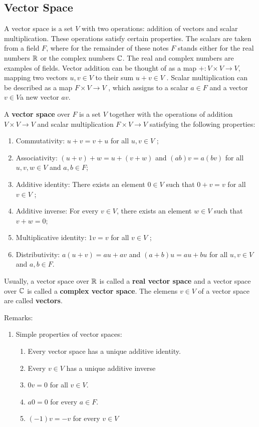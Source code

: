 \documentclass[12pt]{book}
\begin{document}
\subsection{Vector Space}
\label{sec:Vector Space}

A vector space is a set $V$ with two operations: addition of vectors and scalar multiplication. These operations satisfy certain properties. 
The scalars are taken from a field $F$, where for the remainder of these notes $F$ stands either for the real numbers $\mathbb{R}$ or the complex 
numbers $\mathbb{C}$. The real and complex numbers are examples of fields. Vector addition can be thought of as a map $+ : V \times V \rightarrow V $, 
mapping two vectors $u, v \in V$ to their sum $u+ v \in V$ . Scalar multiplication can be described as a map $F \times V \rightarrow V$ , which 
assigns to a scalar $a \in F$ and a vector $v \in V $a new vector $av$.

\begin{defi}\label{def:vcs}
      A \textbf{vector space} over $F$ is a set $V$ together with the operations of addition $V \times V \rightarrow V $ and scalar multiplication 
	  $F \times V \rightarrow V$ satisfying the following properties:
	  \begin{enumerate}
	        \item Commutativity: $u + v = v + u$ for all $u, v \in V$ ;
			\item Associativity: $(u + v) + w = u + (v + w)$ and $(ab)v = a(bv)$ for all $u, v,w \in V$ and $a, b \in F$;
			\item Additive identity: There exists an element $0 \in V$ such that $0 + v = v$ for all $v \in V$ ;
			\item Additive inverse: For every $v \in V$, there exists an element $w \in V$ such that $v+w = 0$;
			\item Multiplicative identity: $1v = v$ for all $v \in V$ ;
			\item Distributivity: $a(u + v) = au + av$ and $(a + b)u = au + bu$ for all $u, v \in V$ and $a, b \in F$.
      \end{enumerate}
\end{defi}
Usually, a vector space over $\mathbb{R}$ is called a \textbf{real vector space} and a vector space over $\mathbb{C}$ is called a \textbf{complex vector space}. 
The elemens $v \in V$ of a vector space are called \textbf{vectors}.

Remarks:
\begin{enumerate}
	  \item Simple properties of vector spaces:
	        \begin{enumerate}
			      \item Every vector space has a unique additive identity.
				  \item Every $v \in V$ has a unique additive inverse
				  \item $0v = 0$ for all $v \in V$.
				  \item $a0 = 0$ for every $a \in F$.
				  \item $(−1)v = −v$ for every $v \in V$
		    \end{enumerate}
\end{enumerate}
\end{document}

